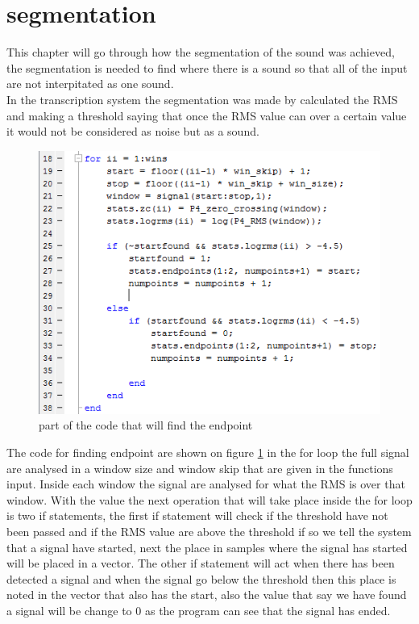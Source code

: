 \section{segmentation}
This chapter will go through how the segmentation of the sound was achieved, the segmentation is needed to find where there is a sound so that all of the input are not interpitated as one sound.\\
In the transcription system the segmentation was made by calculated the RMS and making a threshold saying that once the RMS value can over a certain value it would not be considered as noise but as a sound. \\
\begin{figure}[h]
	\begin{center}
		\includegraphics[scale =  0.8]{fig/Find_Endpoint_script.png}
		\caption{part of the code that will find the endpoint}
		\label{P4_Findendpoints}
	\end{center}
\end{figure}
The code for finding endpoint are shown on figure \ref{P4_Findendpoints} in the for loop the full signal are analysed in a window size and window skip that are given in the functions input. Inside each window the signal are analysed for what the RMS is over that window. With the value the next operation that will take place inside the for loop is two if statements, the first if statement will check if the threshold have not been passed and if the RMS value are above the threshold if so we tell the system that a signal have started, next the place in samples where the signal has started will be placed in a vector. The other if statement will act when there has been detected a signal and when the signal go below the threshold then this place is noted in the vector that also has the start, also the value that say we have found a signal will be change to 0 as the program can see that the signal has ended.\\
